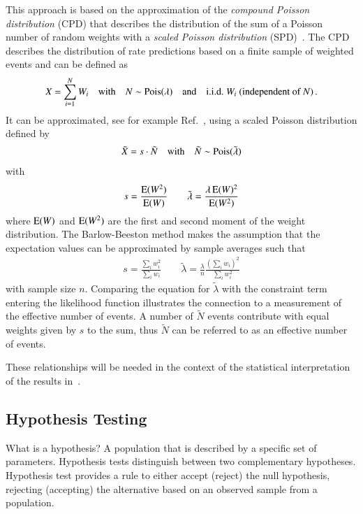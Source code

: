This approach is based on the approximation of the \emph{compound
  Poisson distribution} (CPD) that describes the distribution of the
sum of a Poisson number of random weights with a \emph{scaled Poisson
  distribution} (SPD)~\cite{Bohm:2013gla}. The CPD describes the
distribution of rate predictions based on a finite sample of weighted
events and can be defined as
\begin{align*}
  X = \sum_{i = 1}^{N} W_i \quad \text{with} \quad N \sim \operatorname{Pois}(\lambda) \quad \text{and} \quad \text{i.i.d.\ } W_i \text{ (independent of }N\text{)} \,\text{.}
\end{align*}
It can be approximated, see for example Ref.~\cite{Bohm:2013gla},
using a scaled Poisson distribution defined by
\begin{align*}
  \tilde{X} = s \cdot \tilde{N} \quad \text{with} \quad \tilde{N} \sim \operatorname{Pois}(\tilde{\lambda})
\end{align*}
with
\begin{align*}
  s = \frac{\operatorname{E}(W^2)}{\operatorname{E}(W)} \qquad \tilde{\lambda} = \frac{\lambda \operatorname{E}(W)^2}{\operatorname{E}(W^2)}
\end{align*}
where $\operatorname{E}(W)$ and $\operatorname{E}(W^2)$ are the first and second moment
of the weight distribution. The Barlow-Beeston method makes the
assumption that the expectation values can be approximated by sample
averages such that
\begin{align*}
  s = \frac{\sum_i w_i^2}{\sum_i w_i} \qquad \tilde{\lambda} = \frac{\lambda}{n} \frac{(\sum_i w_i)^2}{\sum_i w_i^2}
\end{align*}
with sample size $n$. Comparing the equation for $\tilde{\lambda}$
with the constraint term entering the likelihood function illustrates
the connection to a measurement of the effective number of events. A
number of $\tilde{N}$ events contribute with equal weights given by
$s$ to the sum, thus $\tilde{N}$ can be referred to as an effective
number of events.

These relationships will be needed in the context of the statistical
interpretation of the results in~.


\subsection{Hypothesis Testing}
\label{sec:hypothesis_testing}

What is a hypothesis? A population that is described by a specific set
of parameters. Hypothesis tests distinguish between two complementary
hypotheses. Hypothesis test provides a rule to either accept (reject)
the null hypothesis, rejecting (accepting) the alternative based on an
observed sample from a population.


